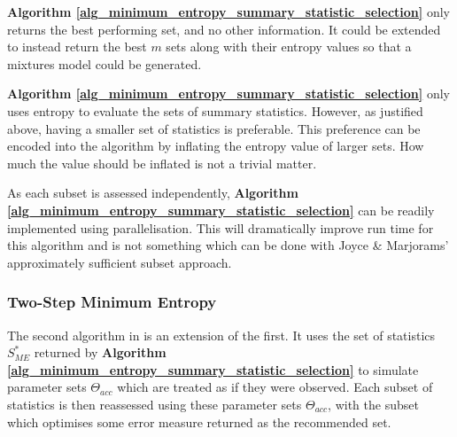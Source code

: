 \documentclass[11pt,a4paper]{article}
\theoremstyle{break}
\begin{document}
  \par \textbf{Algorithm \ref{alg_minimum_entropy_summary_statistic_selection}} only returns the best performing set, and no other information. It could be extended to instead return the best $m$ sets along with their entropy values so that a mixtures model could be generated.

  \par \textbf{Algorithm \ref{alg_minimum_entropy_summary_statistic_selection}} only uses entropy to evaluate the sets of summary statistics. However, as justified above, having a smaller set of statistics is preferable. This preference can be encoded into the algorithm by inflating the entropy value of larger sets. How much the value should be inflated is not a trivial matter. %

  \par As each subset is assessed independently, \textbf{Algorithm \ref{alg_minimum_entropy_summary_statistic_selection}} can be readily implemented using parallelisation. This will dramatically improve run time for this algorithm and is not something which can be done with Joyce \& Marjorams' approximately sufficient subset approach.


\subsubsection{Two-Step Minimum Entropy}\label{sec_two_step_minimum_entropy}

  \par The second algorithm in \cite[]{on_optimal_selection_of_summary_stats_for_ABC} is an extension of the first. It uses the set of statistics $S_{ME}^*$ returned by \textbf{Algorithm \ref{alg_minimum_entropy_summary_statistic_selection}} to simulate parameter sets $\Theta_{acc}$ which are treated as if they were observed. Each subset of statistics is then reassessed using these parameter sets $\Theta_{acc}$, with the subset which optimises some error measure returned as the recommended set.
\end{document}
